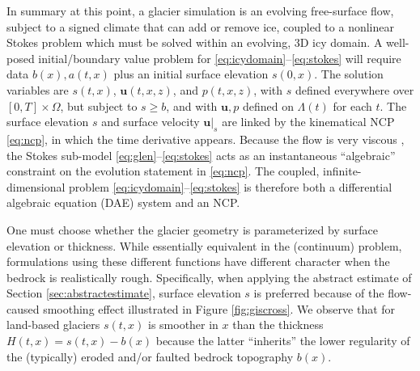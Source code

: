 \documentclass[hidelinks,onefignum,onetabnum,final]{siamart220329}  %
\newcommand{\bu}{\mathbf{u}}
\begin{document}
In summary at this point, a glacier simulation is an evolving free-surface flow, subject to a signed climate that can add or remove ice, coupled to a nonlinear Stokes problem which must be solved within an evolving, 3D icy domain.  A well-posed initial/boundary value problem for \eqref{eq:icydomain}--\eqref{eq:stokes} will require data $b(x),a(t,x)$ plus an initial surface elevation $s(0,x)$.  The solution variables are $s(t,x)$, $\bu(t,x,z)$, and $p(t,x,z)$, with $s$ defined everywhere over $[0,T]\times \Omega$, but subject to $s \ge b$, and with $\bu,p$ defined on $\Lambda(t)$ for each $t$.  The surface elevation $s$ and surface velocity $\bu|_s$ are linked by the kinematical NCP \eqref{eq:ncp}, in which the time derivative appears.  Because the flow is very viscous \cite{Acheson1990}, the Stokes sub-model \eqref{eq:glen}--\eqref{eq:stokes} acts as an instantaneous ``algebraic'' constraint on the evolution statement in \eqref{eq:ncp}.  The coupled, infinite-dimensional problem \eqref{eq:icydomain}--\eqref{eq:stokes} is therefore both a differential algebraic equation (DAE) system \cite{AscherPetzold1998,LofgrenAhlkronaHelanow2022} and an NCP.

One must choose whether the glacier geometry is parameterized by surface elevation or thickness.  While essentially equivalent in the (continuum) problem, formulations using these different functions have different character when the bedrock is realistically rough.  Specifically, when applying the abstract estimate of Section \ref{sec:abstractestimate}, surface elevation $s$ is preferred because of the flow-caused smoothing effect illustrated in Figure \ref{fig:giscross}.  We observe that for land-based glaciers $s(t,x)$ is smoother in $x$ than the thickness $H(t,x) = s(t,x)-b(x)$ because the latter ``inherits'' the lower regularity of the (typically) eroded and/or faulted bedrock topography $b(x)$.
\end{document}

